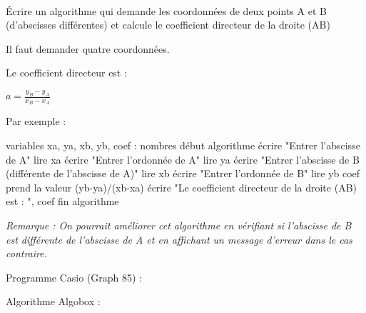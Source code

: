 
%
\\
Écrire un algorithme qui demande les coordonnées de deux points A et B (d'abscisses différentes) et calcule le coefficient directeur de la droite (AB)
\begin{corrige}
     Il faut demander quatre coordonnées.
     \par
     Le coefficient directeur est :
     \par
     $a=\frac{y_B-y_A}{x_B-x_A}$
     \par
     Par exemple :
     \begin{code}
   variables
       xa, ya, xb, yb, coef : nombres
   début algorithme
       écrire "Entrer l'abscisse de A"
       lire xa
       écrire "Entrer l'ordonnée de A"
       lire ya
       écrire "Entrer l'abscisse de B (différente de l'abscisse de A)"
       lire xb
       écrire "Entrer l'ordonnée de B"
       lire yb
       coef prend la valeur (yb-ya)/(xb-xa)
       écrire "Le coefficient directeur de la droite (AB) est : ", coef
   fin algorithme
     \end{code}
     \textit{Remarque : On pourrait améliorer cet algorithme en vérifiant si l'abscisse de B est différente de l'abscisse de A et en affichant un message d'erreur dans le cas contraire.}
\par
     Programme Casio (Graph 85) :
\par
{}%
\par
     Algorithme Algobox :
\par
{}%
\end{corrige}
